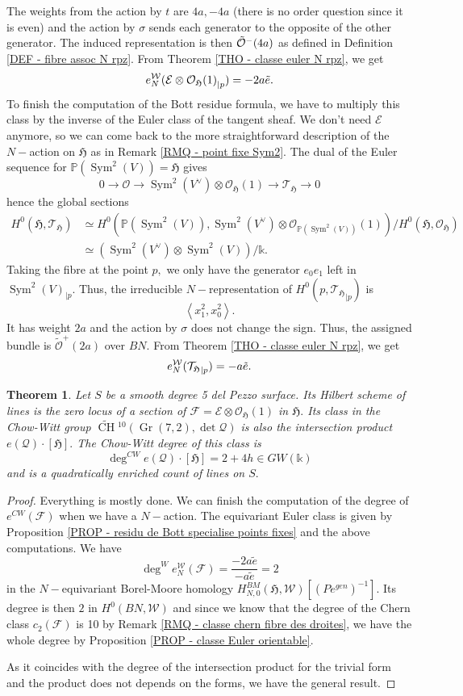 \documentclass{amsart}
\theoremstyle{plain}%
\newtheorem{tho}[subsubsection]{Theorem}
\theoremstyle{remark}
\theoremstyle{definition}
\newcommand{\cE}{\mathcal{E}}
\newcommand{\cF}{\mathcal{F}}
\newcommand{\cO}{\mathcal{O}}
\newcommand{\cQ}{\mathcal{Q}}
\newcommand{\cT}{\mathcal{T}}
\newcommand{\cW}{\mathcal{W}}
\newcommand{\ek}{\mathbb{k}}
\newcommand{\eP}{\mathbb{P}}
\newcommand{\fH}{\mathfrak{H}}
\newcommand{\GW}{GW}
\newcommand{\Chowtilde}[2][]{\widetilde{\operatorname{CH}}{}^{#1}\!\left(#2\right)}
\newcommand{\qscal}[1]{\left\langle #1 \right\rangle}
\newcommand{\Symalg}[2][]{\operatorname{Sym}^{#1}\left(#2\right)}
\newcommand{\Grass}{\operatorname{Gr}}
\newcommand{\rest}[2]{{#1}_{\mid #2}}
\begin{document}
The weights from the action by $t$ are $4a,-4a$ (there is no order question since it is even) and the action by $\sigma$ sends each generator to the opposite of the other generator. The induced representation is then $\Tilde{\cO}^-(4a)$ as defined in Definition \ref{DEF - fibre assoc N rpz}. From Theorem \ref{THO - classe euler N rpz}, we get
\[e_N^\cW(\rest{\cE\otimes\cO_\fH(1)}{p}) = -2a\Tilde{e}.\]
To finish the computation of the Bott residue formula, we have to multiply this class by the inverse of the Euler class of the tangent sheaf. We don't need $\cE$ anymore, so we can come back to the more straightforward description of the $N-$action on $\fH$ as in Remark \ref{RMQ - point fixe Sym2}. The dual of the Euler sequence for $\eP(\Symalg[2]{V}) = \fH$ gives 
\[0\to \cO \to \Symalg[2]{V^\vee}\otimes \cO_\fH(1) \to \cT_{\fH}\to 0\]
hence the global sections
\begin{align*}
    H^0(\fH,\cT_\fH) &\simeq H^0(\eP(\Symalg[2]{V}),\Symalg[2]{V^\vee}\otimes\cO_{\eP(\Symalg[2]{V})}(1))/H^0(\fH,\cO_\fH)\\
    & \simeq (\Symalg[2]{V^\vee}\otimes \Symalg[2]{V})/\ek.
\end{align*}
Taking the fibre at the point $p,$ we only have the generator $e_0e_1$ left in $\rest{\Symalg[2]{V}}{p}$. Thus, the irreducible $N-$representation of $H^0(p,\rest{\cT_\fH}{p})$ is 
\[\qscal{x_1^2, x_0^2}.\]
It has weight $2a$ and the action by $\sigma$ does not change the sign. Thus, the assigned bundle is $\tilde{\cO}^+(2a)$ over $BN.$ From Theorem \ref{THO - classe euler N rpz}, we get
\[e^\cW_N(\rest{\cT_\fH}{p}) = -a\Tilde{e}.\]

\begin{tho}\label{THO - classe euler dP 5}
Let $S$ be a smooth degree 5 del Pezzo surface. Its Hilbert scheme of lines is the zero locus of a section of $\cF = \cE\otimes \cO_\fH(1)$ in $\fH.$ Its class in the Chow-Witt group $\Chowtilde[10]{\Grass(7,2),\det \cQ}$ is also the intersection product $e(\cQ)\cdot [\fH].$ The Chow-Witt degree of this class is 
\[\deg^{CW} e(\cQ)\cdot [\fH] = 2 + 4 h \in \GW(\ek)\]
and is a quadratically enriched count of lines on $S.$
\end{tho}

\begin{proof}
Everything is mostly done. We can finish the computation of the degree of $e^{CW}(\cF)$ when we have a $N-$action. The equivariant Euler class is given by Proposition \ref{PROP - residu de Bott specialise points fixes} and the above computations. We have 
\[\deg^{W} e_N^\cW(\cF) = \frac{-2a\tilde{e}}{-a\tilde{e}} = 2\]
in the $N-$equivariant Borel-Moore homology $H^{BM}_{N,0}(\fH,\cW)[(P e^{gen})^{-1}].$ Its degree is then $2$ in $H^0(BN,\cW)$ and since we know that the degree of the Chern class $c_2(\cF)$ is 10 by Remark \ref{RMQ - classe chern fibre des droites}, we have the whole degree by Proposition \ref{PROP - classe Euler orientable}.

As it coincides with the degree of the intersection product for the trivial form and the product does not depends on the forms, we have the general result.
\end{proof}
\end{document}
